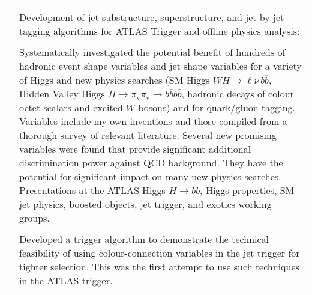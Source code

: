 \begin{longtable}{p{\firstcolumnwidth}p{\secondcolumnwidth}}
& \\
& Development of jet substructure, superstructure, and jet-by-jet tagging algorithms for ATLAS Trigger and offline physics analysis:\\
&\\
& Systematically investigated the potential benefit of hundreds of hadronic event shape variables and jet shape variables for a variety of Higgs and new physics searches (SM Higgs $WH \rightarrow \ell\nu\,b\bar{b}$, Hidden Valley Higgs $H\rightarrow\pi_\mathrm{v}\pi_\mathrm{v}\rightarrow{b\bar{b}}{b\bar{b}}$, hadronic decays of colour octet scalars and excited $W$ bosons) and for quark/gluon tagging. Variables include my own inventions and those compiled from a thorough survey of relevant literature. Several new promising variables were found that provide significant additional discrimination power against QCD background. They have the potential for significant impact on many new physics searches. Presentations at the ATLAS Higgs $H\rightarrow{b\bar{b}}$, Higgs properties, SM jet physics, boosted objects, jet trigger, and exotics working groups.\\
&\\
& Developed a trigger algorithm to demonstrate the technical feasibility of using colour-connection variables in the jet trigger for tighter selection. This was the first attempt to use such techniques in the ATLAS trigger.\\

\end{longtable}
